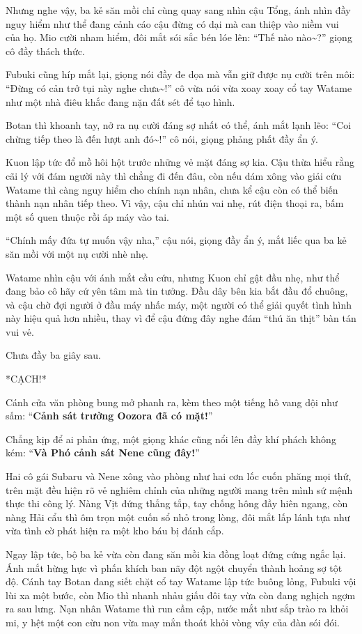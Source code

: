 \documentclass[../main.tex]{subfiles}
\begin{document}
Nhưng nghe vậy, ba kẻ săn mồi chỉ cùng quay sang nhìn cậu Tổng, ánh nhìn đầy nguy hiểm như thể đang cảnh cáo cậu đừng có dại mà can thiệp vào niềm vui của họ. Mio cười nham hiểm, đôi mắt sói sắc bén lóe lên: ``Thế nào nào\~{}?'' giọng cô đầy thách thức.

Fubuki cũng híp mắt lại, giọng nói đầy đe dọa mà vẫn giữ được nụ cười trên môi: ``Đừng có cản trở tụi này nghe chưa\~{}!'' cô vừa nói vừa xoay xoay cổ tay Watame như một nhà điêu khắc đang nặn đất sét để tạo hình.

Botan thì khoanh tay, nở ra nụ cười đáng sợ nhất có thể, ánh mắt lạnh lẽo: ``Coi chừng tiếp theo là đến lượt anh đó\~{}!'' cô nói, giọng phảng phất đầy ẩn ý.

Kuon lập tức đổ mồ hôi hột trước những vẻ mặt đáng sợ kia. Cậu thừa hiểu rằng cãi lý với đám người này thì chẳng đi đến đâu, còn nếu dám xông vào giải cứu Watame thì càng nguy hiểm cho chính nạn nhân, chưa kể cậu còn có thể biến thành nạn nhân tiếp theo. Vì vậy, cậu chỉ nhún vai nhẹ, rút điện thoại ra, bấm một số quen thuộc rồi áp máy vào tai.

``Chính mấy đứa tự muốn vậy nha,'' cậu nói, giọng đầy ẩn ý, mắt liếc qua ba kẻ săn mồi với một nụ cười nhè nhẹ.

Watame nhìn cậu với ánh mắt cầu cứu, nhưng Kuon chỉ gật đầu nhẹ, như thể đang bảo cô hãy cứ yên tâm mà tin tưởng. Đầu dây bên kia bắt đầu đổ chuông, và cậu chờ đợi người ở đầu máy nhấc máy, một người có thể giải quyết tình hình này hiệu quả hơn nhiều, thay vì để cậu đứng đây nghe đám ``thú ăn thịt'' bàn tán vui vẻ.

Chưa đầy ba giây sau.

*CẠCH!*

Cánh cửa văn phòng bung mở phanh ra, kèm theo một tiếng hô vang dội như sấm: ``\textbf{Cảnh sát trưởng Oozora đã có mặt!}''

Chẳng kịp để ai phản ứng, một giọng khác cũng nổi lên đầy khí phách không kém: ``\textbf{Và Phó cảnh sát Nene cũng đây!}''


Hai cô gái Subaru và Nene xông vào phòng như hai cơn lốc cuốn phăng mọi thứ, trên mặt đều hiện rõ vẻ nghiêm chỉnh của những người mang trên mình sứ mệnh thực thi công lý. Nàng Vịt đứng thẳng tắp, tay chống hông đầy hiên ngang, còn nàng Hải cẩu thì ôm trọn một cuốn sổ nhỏ trong lòng, đôi mắt lấp lánh tựa như vừa tình cờ phát hiện ra một kho báu bị đánh cắp.

Ngay lập tức, bộ ba kẻ vừa còn đang săn mồi kia đồng loạt đứng cứng ngắc lại. Ánh mắt hừng hực vì phấn khích ban nãy đột ngột chuyển thành hoảng sợ tột độ. Cánh tay Botan đang siết chặt cổ tay Watame lập tức buông lỏng, Fubuki vội lùi xa một bước, còn Mio thì nhanh nhảu giấu đôi tay vừa còn đang nghịch ngợm ra sau lưng. Nạn nhân Watame thì run cầm cập, nước mắt như sắp trào ra khỏi mi, y hệt một con cừu non vừa may mắn thoát khỏi vòng vây của đàn sói đói.
\end{document}
